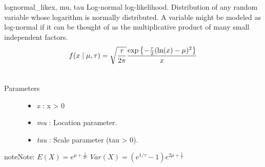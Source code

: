 \hypertarget{pymc.distributions.lognormal_like}{}\begin{funcdesc}{lognormal\_like}{x, mu, tau}
Log-normal log-likelihood. Distribution of any random variable whose
logarithm is normally distributed. A variable might be modeled as
log-normal if it can be thought of as the multiplicative product of many
small independent factors.
\begin{gather}
\begin{split}f(x \mid \mu, \tau) = \sqrt{\frac{\tau}{2\pi}}\frac{
\exp\left\{ -\frac{\tau}{2} (\ln(x)-\mu)^2 \right\}}{x}\end{split}\notag\\\begin{split}\end{split}\notag
\end{gather}\begin{description}
\item[Parameters] \leavevmode\begin{itemize}
\item {}
\emph{x} : x \textgreater{} 0

\item {}
\emph{mu} : Location parameter.

\item {}
\emph{tau} : Scale parameter (tau \textgreater{} 0).

\end{itemize}

\end{description}

\begin{notice}{note}{Note:}
$E(X)=e^{\mu+\frac{1}{2\tau}}$
$Var(X)=(e^{1/\tau}-1)e^{2\mu+\frac{1}{\tau}}$
\end{notice}
\end{funcdesc}


